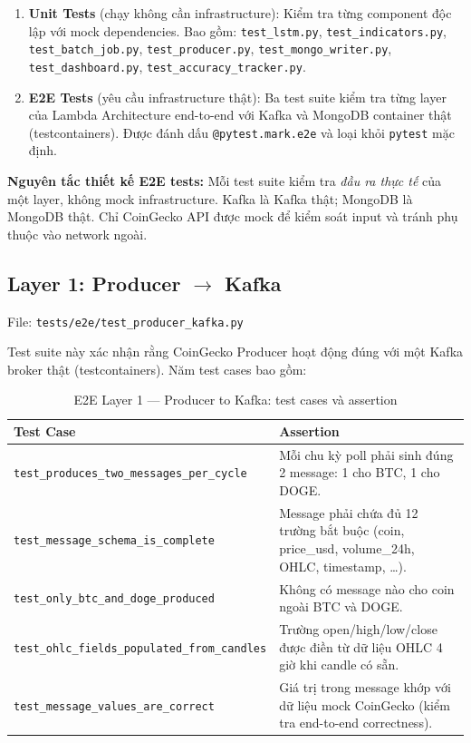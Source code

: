 \documentclass[12pt, a4paper]{article}
\newenvironment{infobox}{%
  \begin{lrbox}{\infoBoxContent}%
  \begin{minipage}[t]{\dimexpr\linewidth-18pt\relax}%
  \setlength{\parskip}{4pt}\small\vspace{4pt}%
}{%
  \vspace{4pt}%
  \end{minipage}%
  \end{lrbox}%
  \par\smallskip\noindent
  \setlength{\fboxsep}{6pt}\setlength{\fboxrule}{0.6pt}%
  \fcolorbox{blue!35!white}{blue!5!white}{\usebox{\infoBoxContent}}%
  \par\smallskip
}
\begin{document}
\begin{enumerate}
  \item \textbf{Unit Tests} (chạy không cần infrastructure): Kiểm tra từng component
    độc lập với mock dependencies. Bao gồm: \texttt{test\_lstm.py},
    \texttt{test\_indicators.py}, \texttt{test\_batch\_job.py},
    \texttt{test\_producer.py}, \texttt{test\_mongo\_writer.py},
    \texttt{test\_dashboard.py}, \texttt{test\_accuracy\_tracker.py}.

  \item \textbf{E2E Tests} (yêu cầu infrastructure thật): Ba test suite kiểm tra
    từng layer của Lambda Architecture end-to-end với Kafka và MongoDB container thật
    (testcontainers). Được đánh dấu \texttt{@pytest.mark.e2e} và loại khỏi
    \texttt{pytest} mặc định.
\end{enumerate}

\begin{infobox}
\textbf{Nguyên tắc thiết kế E2E tests:} Mỗi test suite kiểm tra \textit{đầu ra thực
tế} của một layer, không mock infrastructure. Kafka là Kafka thật; MongoDB là MongoDB
thật. Chỉ CoinGecko API được mock để kiểm soát input và tránh phụ thuộc vào network
ngoài.
\end{infobox}

\subsection{Layer 1: Producer $\to$ Kafka}

File: \texttt{tests/e2e/test\_producer\_kafka.py}

Test suite này xác nhận rằng CoinGecko Producer hoạt động đúng với một Kafka broker
thật (testcontainers). Năm test cases bao gồm:

\begin{table}[H]
  \centering
  \caption{E2E Layer 1 --- Producer to Kafka: test cases và assertion}
  \label{tab:e2e_layer1}
  \begin{tabularx}{\textwidth}{lX}
    \toprule
    Test Case & Assertion \\
    \midrule
    \texttt{test\_produces\_two\_messages\_per\_cycle} & Mỗi chu kỳ poll phải sinh
      đúng 2 message: 1 cho BTC, 1 cho DOGE. \\
    \texttt{test\_message\_schema\_is\_complete} & Message phải chứa đủ 12 trường
      bắt buộc (coin, price\_usd, volume\_24h, OHLC, timestamp, \ldots). \\
    \texttt{test\_only\_btc\_and\_doge\_produced} & Không có message nào cho
      coin ngoài BTC và DOGE. \\
    \texttt{test\_ohlc\_fields\_populated\_from\_candles} & Trường open/high/low/close
      được điền từ dữ liệu OHLC 4 giờ khi candle có sẵn. \\
    \texttt{test\_message\_values\_are\_correct} & Giá trị trong message khớp với
      dữ liệu mock CoinGecko (kiểm tra end-to-end correctness). \\
    \bottomrule
  \end{tabularx}
\end{table}
\end{document}
